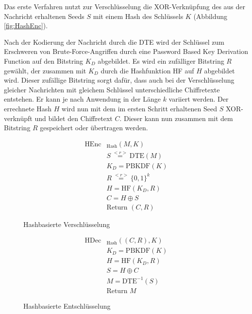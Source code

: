 Das erste Verfahren nutzt zur Verschlüsselung die XOR-Verknüpfung des aus der Nachricht erhaltenen Seeds \(S\) mit einem Hash des Schlüssels \(K\) (Abbildung \ref{fig:HashEnc}).  

Nach der Kodierung der Nachricht durch die DTE wird der Schlüssel zum Erschweren von Brute-Force-Angriffen durch eine Password Based Key Derivation Function auf den Bitstring \(K_D\) abgebildet. Es wird ein zufälliger Bitstring \(R\) gewählt, der zusammen mit \(K_D\) durch die Hashfunktion HF auf \(H\) abgebildet wird. Dieser zufällige Bitstring sorgt dafür, dass auch bei der Verschlüsselung gleicher Nachrichten mit gleichem Schlüssel unterschiedliche Chiffretexte entstehen. Er kann je nach Anwendung in der Länge \(k\) variiert werden. Der errechnete Hash \(H\) wird nun mit dem im ersten Schritt erhaltenen Seed \(S\) XOR-verknüpft und bildet den Chiffretext \(C\). Dieser kann nun zusammen mit dem Bitstring \(R\) gespeichert oder übertragen werden. 

\begin{figure}[h]
	\begin{minipage}[b]{0.5\textwidth}
		\begin{align*}
			\text{HEnc}&_{\text{Hash}}(M, K)\\
			&S \overset{<r>}{=} \text{DTE}(M)\\ 	%
			&K_D = \text{PBKDF}(K)\\ 		%
			&R \overset{<r>}{=} \{0,1\}^k\\	%
			&H = \text{HF}(K_D,R)\\	%
			&C = H \oplus S\\	%
			&\text{Return } (C,R)
		\end{align*}
		\caption{Hashbasierte Verschlüsselung}
		\label{fig:HashEnc}
	\end{minipage}
	\begin{minipage}[b]{0.5\textwidth}
		\begin{align*}
			\text{HDec}&_{\text{Hash}}((C,R), K)\\
			&K_D = \text{PBKDF}(K)\\ 		%
			&H = \text{HF}(K_D,R)\\	%
			&S = H \oplus C\\	%
			&M = \text{DTE}^{-1}(S)\\ 	%
			&\text{Return } M
		\end{align*}
		\caption{Hashbasierte Entschlüsselung}
		\label{fig:HashDec}
	\end{minipage}
\end{figure}

